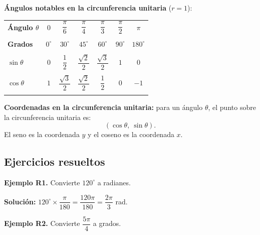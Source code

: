 \documentclass[12pt, a4paper]{article}
\begin{document}
  \begin{cuadrosolucion}
    \textbf{Ángulos notables en la circunferencia unitaria} ($r = 1$):

    \begin{center}
      \begin{tabular}{lcccccc}
        \toprule
        \textbf{Ángulo $\theta$} & $0$       & $\dfrac{\pi}{6}$      & $\dfrac{\pi}{4}$      & $\dfrac{\pi}{3}$      & $\dfrac{\pi}{2}$ & $\pi$       \\\\
        \textbf{Grados}          & $0^\circ$ & $30^\circ$            & $45^\circ$            & $60^\circ$            & $90^\circ$       & $180^\circ$ \\\\
        \midrule
        $\sin\theta$             & $0$       & $\dfrac{1}{2}$        & $\dfrac{\sqrt{2}}{2}$ & $\dfrac{\sqrt{3}}{2}$ & $1$              & $0$         \\\\
        $\cos\theta$             & $1$       & $\dfrac{\sqrt{3}}{2}$ & $\dfrac{\sqrt{2}}{2}$ & $\dfrac{1}{2}$        & $0$              & $-1$        \\\\
        \bottomrule
      \end{tabular}
    \end{center}
  \end{cuadrosolucion}

  \begin{cuadroadvertencia}
    \textbf{Coordenadas en la circunferencia unitaria:} para un ángulo $\theta$, el punto sobre la circunferencia unitaria es:
    $$(\cos\theta,\ \sin\theta).$$
    El seno es la coordenada $y$ y el coseno es la coordenada $x$.
  \end{cuadroadvertencia}

  \subsection{Ejercicios resueltos}

  \textbf{Ejemplo R1.} Convierte $120^\circ$ a radianes.

  \begin{cuadrosolucion}
    \textbf{Solución:} $120^\circ \times \dfrac{\pi}{180} = \dfrac{120\pi}{180} = \dfrac{2\pi}{3}$ rad.
  \end{cuadrosolucion}

  \textbf{Ejemplo R2.} Convierte $\dfrac{5\pi}{4}$ a grados.
\end{document}
